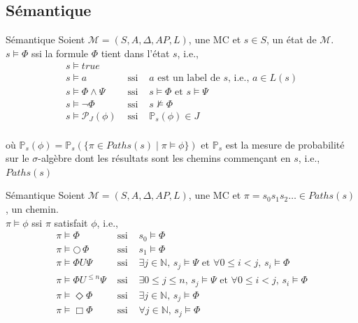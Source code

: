 \documentclass[compress]{beamer}
\begin{document}
\subsection{Sémantique}
\begin{frame}{Sémantique}
  Soient $\mathcal{M} = (S, A, \Delta, AP, L)$, une MC et $s \in S$, un {\color{fibeamer@orange}état}
  de $\mathcal{M}$. \\
  $s \models \Phi$ ssi la formule $\Phi$ tient dans l'état $s$, i.e.,
  \begin{align*}
    &s \models true &&&\\
    &s \models a &\text{ ssi }& a \text{ est un label de $s$, i.e., } a \in L(s)&\\
    &s \models \Phi \wedge \Psi&\text{ ssi }& s \models \Phi \text{ et } s \models \Psi&\\
    &s \models \neg \Phi &\text{ ssi }& s \not\models \Phi&\\
    &s \models \mathcal{P}_J(\phi) &\text{ ssi }& \mathbb{P}_s(\phi) \in J&\\
  \end{align*}

    \vspace{-0.05\linewidth}

    où $\mathbb{P}_s(\phi) = \mathbb{P}_s(\{\pi \in Paths(s) \; | \; \pi \models \phi\})$ et $\mathbb{P}_s$ est la mesure de probabilité sur le $\sigma$-algèbre dont les résultats sont les chemins commençant en $s$, i.e.,
    $Paths(s)$
\end{frame}

\begin{frame}{Sémantique}
  Soient $\mathcal{M} = (S, A, \Delta, AP, L)$, une MC et $\pi = s_0s_1s_2\dots \in Paths(s)$, un {\color{fibeamer@orange}chemin}.\\
  $\pi \models \phi$ ssi $\pi$ satisfait $\phi$, i.e.,
  \begin{align*}
  &\pi \models \Phi&\text{ ssi }&s_0 \models \Phi&\\
  &\pi \models \bigcirc\, \Phi&\text{ ssi }&s_1 \models \Phi&\\
  &\pi \models \Phi U \Psi &\text{ ssi }& \exists j \in \mathbb{N},\, s_j \models \Psi
    \text{ et } \forall 0 \leq i < j, \, s_i \models \Phi&\\
  &\pi \models \Phi U^{\leq n} \Psi &\text{ ssi }& \exists 0 \leq j \leq n ,\, s_j \models \Psi
    \text{ et } \forall 0 \leq i < j, \, s_i \models \Phi&\\
  & \pi \models \Diamond \Phi&\text{ ssi }& \exists j \in \mathbb{N}, \, s_j \models \Phi&\\
  & \pi \models \Box \Phi&\text{ ssi }& \forall j \in \mathbb{N}, \, s_j \models \Phi&
  \end{align*}
\end{frame}
\end{document}
